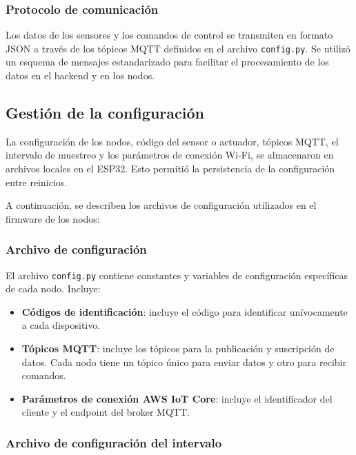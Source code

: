 \subsubsection{Protocolo de comunicación}

Los datos de los sensores y los comandos de control se transmiten en formato
JSON a través de los tópicos MQTT definidos en el archivo \texttt{config.py}.
Se utilizó un esquema de mensajes estandarizado para facilitar el procesamiento
de los datos en el backend y en los nodos.


\subsection{Gestión de la configuración}

La configuración de los nodos, código del sensor o actuador, tópicos MQTT, el
intervalo de muestreo y los parámetros de conexión Wi-Fi, se almacenaron en
archivos locales en el ESP32. Esto permitió la persistencia de la configuración
entre reinicios.

A continuación, se describen los archivos de configuración utilizados en el
firmware de los nodos:

\subsubsection{Archivo de configuración}

El archivo \texttt{config.py} contiene constantes y variables de configuración
específicas de cada nodo. Incluye:
\begin{itemize}
    \item \textbf{Códigos de identificación}: incluye el código para identificar unívocamente
          a cada dispositivo.
    \item \textbf{Tópicos MQTT}: incluye los tópicos para la publicación y
          suscripción de datos. Cada nodo tiene un tópico único para enviar datos
          y otro para recibir comandos.
    \item \textbf{Parámetros de conexión AWS IoT Core}: incluye el identificador del cliente y el
          endpoint del broker MQTT.
\end{itemize}

\subsubsection{Archivo de configuración del intervalo}

